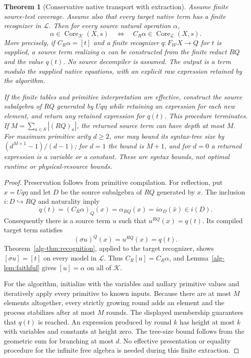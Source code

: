 \documentclass[11pt]{article}
\newtheorem{theorem}{Theorem}[section]
\theoremstyle{definition}
\theoremstyle{remark}
\newcommand{\Core}{\operatorname{Core}}
\begin{document}
\begin{theorem}[Conservative native transport with extraction]
\label{alg-thm:transport}
Assume finite source-test coverage. Assume also that every target native
term has a finite recognizer in $\mathcal L$. Then for every source
natural operation $\alpha$,
\begin{equation}\label{alg-eq:reflectnative}
 \alpha\in\Core_{\mathcal K}(X,s)
 \quad\Longleftrightarrow\quad
 C_R\alpha\in\Core_{\mathcal L}(X,s).
\end{equation}
More precisely, if $C_R\alpha=[t]$ and a finite recognizer
$q:F_{\mathcal W}X\to Q$ for $t$ is supplied, a source term realizing
$\alpha$ can be constructed from the finite reduct $RQ$ and the value
$q(t)$. No source decompiler is assumed. The output is a term modulo the supplied
native equations, with an explicit raw expression retained by the algorithm.

If the finite tables and primitive interpretation are effective, construct
the source subalgebra of $RQ$ generated by $Uq\eta$ while retaining an
expression for each new element, and return any retained expression for
$q(t)$. This procedure terminates. If $M=\sum_{a\in S}|(RQ)_a|$, the
returned source term can have depth at most $M$. For maximum primitive
arity $d\geq2$, one may bound its syntax-tree size by
$(d^{M+1}-1)/(d-1)$; for $d=1$ the bound is $M+1$, and for $d=0$ a returned expression
is a variable or a constant. These are syntax bounds, not optimal runtime
or physical-resource bounds.
\end{theorem}
\begin{proof}
Preservation follows from primitive compilation. For reflection, put
$x=Uq\eta$ and let $D$ be the source subalgebra of $RQ$ generated by $x$.
The inclusion $i:D\hookrightarrow RQ$ and naturality imply
\[
 q(t)=(C_R\alpha)_Q(x)=\alpha_{RQ}(x)
       =i\alpha_D(\bar x)\in i(D).
\]
Consequently there is a source term $u$ such that $u^{RQ}(x)=q(t)$.
Its compiled target term satisfies
\[
          (\sigma u)^Q(x)=u^{RQ}(x)=q(t).
\]
Theorem~\ref{alg-thm:recognition}, applied to the target recognizer, shows
$[\sigma u]=[t]$ on every model in $\mathcal L$. Thus
$C_R[u]=C_R\alpha$, and Lemma~\ref{alg-lem:faithful} gives $[u]=\alpha$ on
all of $\mathcal K$.

For the algorithm, initialize with the variables and nullary primitive
values and iteratively apply every primitive to known inputs. Because
there are at most $M$ elements altogether, every strictly growing round
adds an element and the process stabilizes after at most $M$ rounds.
The displayed membership guarantees that $q(t)$ is reached. An expression
produced by round $k$ has height at most $k$ with variables and constants
at height zero. The tree-size bound follows from the geometric sum for
branching at most $d$. No effective presentation or equality procedure for
the infinite free algebra is needed during this finite extraction.
\end{proof}
\end{document}
